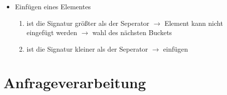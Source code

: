 \documentclass[a4paper]{article}
\begin{document}
\begin{enumerate}
\begin{itemize}
\begin{itemize}
                \item Einfügen eines Elementes
                \begin{enumerate}
                    \item ist die Signatur größter als der Seperator $\to$ Element kann nicht eingefügt werden $\to$ wahl des nächsten Buckets
                    \item ist die Signatur kleiner als der Seperator $\to$ einfügen
                \end{enumerate}
            \end{itemize}
        \end{itemize}
    \end{enumerate}

\section{Anfrageverarbeitung}
\end{document}
